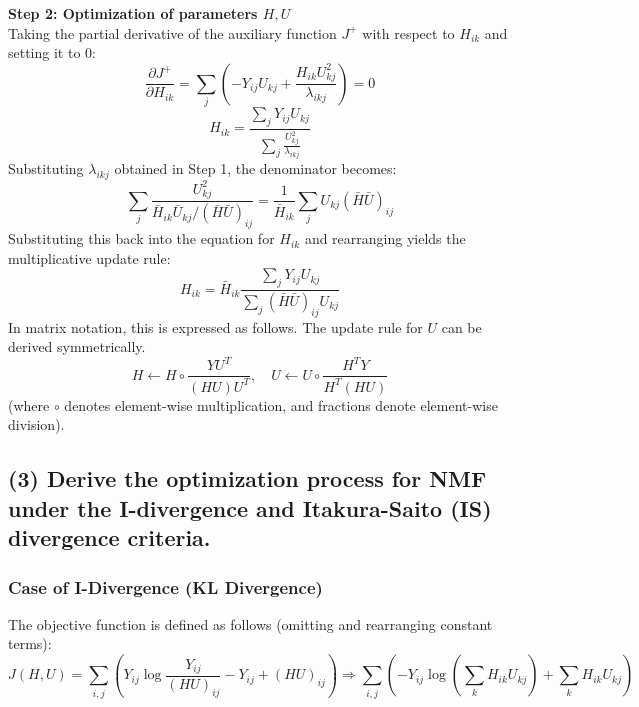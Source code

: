 \documentclass[12pt,a4paper]{article}
\begin{document}
\textbf{Step 2: Optimization of parameters $H, U$} \\
Taking the partial derivative of the auxiliary function $J^+$ with respect to $H_{ik}$ and setting it to 0:
\begin{equation}
\frac{\partial J^+}{\partial H_{ik}} = \sum_j \left( - Y_{ij} U_{kj} + \frac{H_{ik} U_{kj}^2}{\lambda_{ikj}} \right) = 0
\end{equation}
\begin{equation}
H_{ik} = \frac{\sum_j Y_{ij} U_{kj}}{\sum_j \frac{U_{kj}^2}{\lambda_{ikj}}}
\end{equation}
Substituting $\lambda_{ikj}$ obtained in Step 1, the denominator becomes:
\begin{equation}
\sum_j \frac{U_{kj}^2}{\bar{H}_{ik}\bar{U}_{kj} / (\bar{H}\bar{U})_{ij}} = \frac{1}{\bar{H}_{ik}} \sum_j U_{kj} (\bar{H}\bar{U})_{ij}
\end{equation}
Substituting this back into the equation for $H_{ik}$ and rearranging yields the multiplicative update rule:
\begin{equation}
H_{ik} = \bar{H}_{ik} \frac{\sum_j Y_{ij} U_{kj}}{\sum_j (\bar{H}\bar{U})_{ij} U_{kj}}
\end{equation}
In matrix notation, this is expressed as follows. The update rule for $U$ can be derived symmetrically.
\begin{equation}
H \leftarrow H \circ \frac{Y U^T}{(H U) U^T}, \quad U \leftarrow U \circ \frac{H^T Y}{H^T (H U)}
\end{equation}
(where $\circ$ denotes element-wise multiplication, and fractions denote element-wise division).

\subsection*{(3) Derive the optimization process for NMF under the I-divergence and Itakura-Saito (IS) divergence criteria.}

\subsubsection*{Case of I-Divergence (KL Divergence)}
The objective function is defined as follows (omitting and rearranging constant terms):
\begin{equation}
J(H, U) = \sum_{i,j} \left( Y_{ij} \log \frac{Y_{ij}}{(HU)_{ij}} - Y_{ij} + (HU)_{ij} \right) \Rightarrow \sum_{i,j} \left( - Y_{ij} \log \left(\sum_k H_{ik}U_{kj}\right) + \sum_k H_{ik}U_{kj} \right)
\end{equation}
\end{document}
